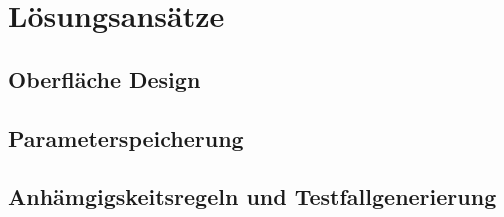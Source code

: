 \chapter{Lösungsansätze}\label{chp:loesungsansaetze}

\section{Oberfläche Design}
\paragraph{}


\section{Parameterspeicherung}


\section{Anhämgigskeitsregeln und Testfallgenerierung}
